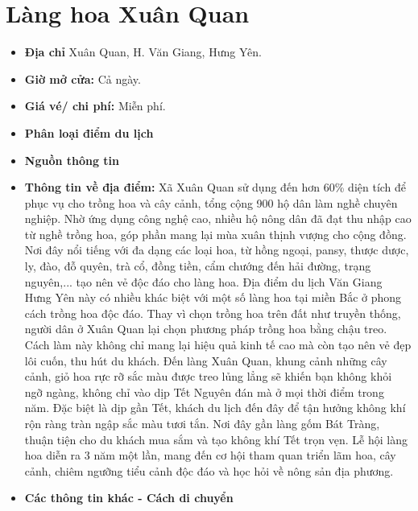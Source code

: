 \documentclass{article}
\begin{document}
\section{Làng hoa Xuân Quan}
\begin{itemize}
    \item{\textbf{Địa chỉ}} Xuân Quan, H. Văn Giang, Hưng Yên.

    \item{\textbf{Giờ mở cửa:}} Cả ngày.

    \item{\textbf{Giá vé/ chi phí:}} Miễn phí.

    \item{\textbf{Phân loại điểm du lịch}} 

    \item{\textbf{Nguồn thông tin}} 

    \item{\textbf{Thông tin về địa điểm:}} Xã Xuân Quan sử dụng đến hơn 60\% diện tích để phục vụ cho trồng hoa và cây cảnh, tổng cộng 900 hộ dân làm nghề chuyên nghiệp. Nhờ ứng dụng công nghệ cao, nhiều hộ nông dân đã đạt thu nhập cao từ nghề trồng hoa, góp phần mang lại mùa xuân thịnh vượng cho cộng đồng. Nơi đây nổi tiếng với đa dạng các loại hoa, từ hồng ngoại, pansy, thược dược, ly, đào, đỗ quyên, trà cổ, đồng tiền, cẩm chướng đến hải đường, trạng nguyên,... tạo nên vẻ độc đáo cho làng hoa. Địa điểm du lịch Văn Giang Hưng Yên này có nhiều khác biệt với một số làng hoa tại miền Bắc ở phong cách trồng hoa độc đáo. Thay vì chọn trồng hoa trên đất như truyền thống, người dân ở Xuân Quan lại chọn phương pháp trồng hoa bằng chậu treo. Cách làm này không chỉ mang lại hiệu quả kinh tế cao mà còn tạo nên vẻ đẹp lôi cuốn, thu hút du khách. Đến làng Xuân Quan, khung cảnh những cây cảnh, giỏ hoa rực rỡ sắc màu được treo lủng lẳng sẽ khiến bạn không khỏi ngỡ ngàng, không chỉ vào dịp Tết Nguyên đán mà ở mọi thời điểm trong năm. Đặc biệt là dịp gần Tết, khách du lịch đến đây để tận hưởng không khí rộn ràng tràn ngập sắc màu tươi tắn. Nơi đây gần làng gốm Bát Tràng, thuận tiện cho du khách mua sắm và tạo không khí Tết trọn vẹn. Lễ hội làng hoa diễn ra 3 năm một lần, mang đến cơ hội tham quan triển lãm hoa, cây cảnh, chiêm ngưỡng tiểu cảnh độc đáo và học hỏi về nông sản địa phương.
\end{itemize}

\begin{itemize}
    \item{\textbf{Các thông tin khác - Cách di chuyển}} 
\end{itemize}
\end{document}
